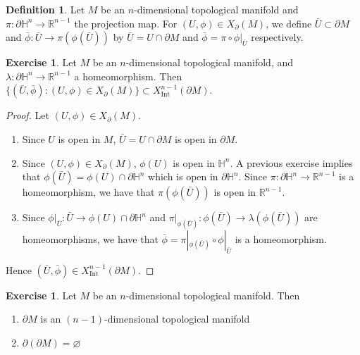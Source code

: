 \documentclass{book}
\theoremstyle{definition}
\newtheorem{defn}[definition]{Definition}
\newtheorem{ex}[definition]{Exercise}
\newcommand{\lam}{\lambda}
\renewcommand{\H}{\mathbb{H}}
\newcommand{\R}{\mathbb{R}}
\DeclareMathOperator{\Int}{Int}
\DeclareMathOperator*{\0}{\mbf{0}}
\DeclareMathOperator*{\1}{\mbf{1}}
\newcommand{\p}{\partial}
\begin{document}
	\begin{defn}
		Let $M$ be an $n$-dimensional topological manifold and $\pi:\p \H^n \rightarrow \R^{n-1}$ the projection map. For $(U, \phi) \in X_{\p}(M)$, we define $\bar{U} \subset \p M$ and $\bar{\phi}: \bar{U} \rightarrow \pi (\phi(\bar{U}))$ by $\bar{U} = U \cap \p M$ and $\bar{\phi} = \pi \circ \phi|_{\bar{U}}$ respectively. 
	\end{defn}

	\begin{ex}
		Let $M$ be an $n$-dimensional topological manifold,  and $\lam: \p \H^n \rightarrow \R^{n-1}$ a homeomorphism. Then $\{(\bar{U}, \bar{\phi}): (U, \phi) \in X_{\p}(M)\} \subset X^{n-1}_{\Int}(\p M)$.
	\end{ex}

	\begin{proof}
		Let $(U, \phi) \in X_{\p}(M)$.
		\begin{enumerate}
			\item Since $U$ is open in $M$, $\bar{U} = U \cap \p M$ is open in $\p M$. 
			\item Since $(U, \phi) \in X_{\p}(M)$, $\phi(U)$ is open in $\H^n$. A previous exercise implies that $\phi(\bar{U}) = \phi(U) \cap \p \H^n$ which is open in $\p \H^n$. Since $\pi: \p \H^n \rightarrow \R^{n-1}$ is a homeomorphism, we have that $\pi(\phi(\bar{U}))$ is open in $\R^{n-1}$. 
			\item Since $\phi|_{\bar{U}}: \bar{U} \rightarrow \phi(U) \cap \p \H^n$ and $\pi|_{\phi(\bar{U})} : \phi(\bar{U}) \rightarrow \lam(\phi(\bar{U})) $ are homeomorphisms, we have that $\bar{\phi} = \pi|_{\phi(\bar{U})} \circ \phi|_{\bar{U}}$ is a homeomorphism.
		\end{enumerate}
		Hence $(\bar{U}, \bar{\phi}) \in  X^{n-1}_{\Int}(\p M)$.
	\end{proof}

	\begin{ex}
		Let $M$ be an $n$-dimensional topological manifold. Then 
		\begin{enumerate}
			\item $\p M$ is an $(n-1)$-dimensional topological manifold
			\item $\p (\p M) = \varnothing$
		\end{enumerate}
	\end{ex}
\end{document}
